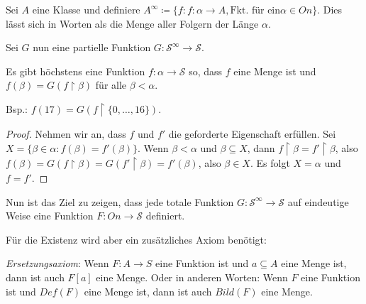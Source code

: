 Sei $A$ eine Klasse und definiere $A^\infty\coloneqq\{f : f:\alpha\to A, \text{Fkt. für ein} \alpha\in On\}$. Dies lässt sich in Worten als die Menge aller Folgern der Länge $\alpha$.

Sei $G$ nun eine partielle Funktion $G:\mathcal{S}^\infty\to\mathcal{S}$.

\begin{lemma}
	Es gibt höchstens eine Funktion $f:\alpha\to \mathcal{S}$ so, dass $f$ eine Menge ist und $f(\beta)=G(f\upharpoonright\beta)$ für alle $\beta < \alpha$.
\end{lemma}
Bsp.: $f(17)=G(f\upharpoonright\{0,\dots,16\})$.
\begin{proof}
	Nehmen wir an, dass $f$ und $f'$ die geforderte Eigenschaft erfüllen. Sei $X=\{\beta \in\alpha : f(\beta)=f'(\beta)\}$. Wenn $\beta < \alpha$ und $\beta\subseteq X$, dann $f\upharpoonright\beta =f'\upharpoonright\beta$, also $f(\beta)=G(f\upharpoonright\beta)=G(f'\upharpoonright\beta)=f'(\beta)$, also $\beta\in X$. Es folgt $X=\alpha$ und $f=f'$.
\end{proof}

Nun ist das Ziel zu zeigen, dass jede totale Funktion $G:\mathcal{S}^\infty\to\mathcal{S}$ auf eindeutige Weise eine Funktion $F:On\to\mathcal{S}$ definiert.

Für die Existenz wird aber ein zusätzliches Axiom benötigt:

\textit{Ersetzungsaxiom}: Wenn $F:A\to S$ eine Funktion ist und $a\subseteq A$ eine Menge ist, dann ist auch $F[a]$ eine Menge. Oder in anderen Worten: Wenn $F$ eine Funktion ist und $Def(F)$ eine Menge ist, dann ist auch $Bild(F)$ eine Menge.

